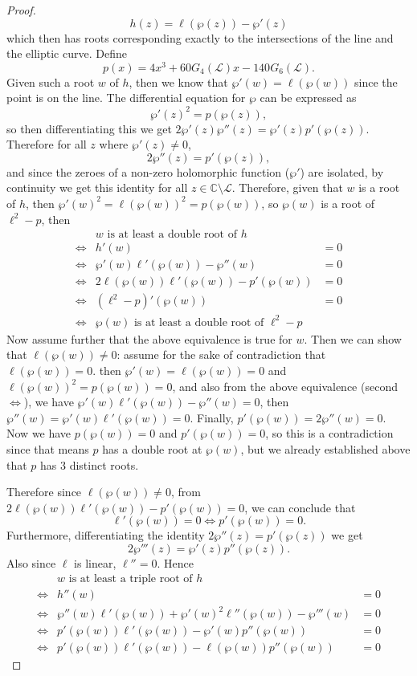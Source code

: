 \documentclass[10pt,a4paper]{amsart}
\begin{document}
\begin{proof}
$$h(z)=\ell(\wp(z))-\wp'(z)$$
which then has roots corresponding exactly to the intersections of the line and the elliptic curve. Define 
$$p(x)=4x^3+60G_4(\mathcal L)x-140G_6(\mathcal L).$$ Given such a root $w$ of $h$, then we know that $\wp'(w)=\ell(\wp(w))$ since the point is on the line. The differential equation for $\wp$ can be expressed as $$\wp'(z)^2=p(\wp(z)),$$
so then differentiating this we get $2\wp'(z)\wp''(z)=\wp'(z)p'(\wp(z))$. Therefore for all $z$ where $\wp'(z)\neq0$, 
$$2\wp''(z)=p'(\wp(z)),$$
and since the zeroes of a non-zero holomorphic function ($\wp'$) are isolated, by continuity we get this identity for all $z\in\mathbb C\setminus\mathcal L$. Therefore, given that $w$ is a root of $h$, then $\wp'(w)^2=\ell(\wp(w))^2=p(\wp(w))$, so $\wp(w)$ is a root of $\ell^2-p$, then
\begin{align*}
&\text{$w$ is at least a double root of $h$}\\
   \iff&h'(w)&=0\\ 
   \iff& \wp'(w)\ell'(\wp(w))-\wp''(w)&=0\\ 
   \iff&2\ell(\wp(w))\ell'(\wp(w))-p'(\wp(w))&=0\\
   \iff&(\ell^2-p)'(\wp(w))&=0\\
   \iff&\text{$\wp(w)$ is at least a double root of $\ell^2-p$}
\end{align*}
Now assume further that the above equivalence is true for $w$. Then we can show that $\ell(\wp(w))\neq0$: assume for the sake of contradiction that $\ell(\wp(w))=0$. then $\wp'(w)=\ell(\wp(w))=0$ and $\ell(\wp(w))^2=p(\wp(w))=0$, and also from the above equivalence (second $\iff$), we have $\wp'(w)\ell'(\wp(w))-\wp''(w)=0$, then $\wp''(w)=\wp'(w)\ell'(\wp(w))=0$. Finally, $p'(\wp(w))=2\wp''(w)=0$. Now we have $p(\wp(w))=0$ and $p'(\wp(w))=0$, so this is a contradiction since that means $p$ has a double root at $\wp(w)$, but we already established above that $p$ has $3$ distinct roots. 

Therefore since $\ell(\wp(w))\neq0$, from $2\ell(\wp(w))\ell'(\wp(w))-p'(\wp(w))=0$, we can conclude that 
$$\ell'(\wp(w))=0\iff p'(\wp(w))=0.$$
Furthermore, differentiating the identity $2\wp''(z)=p'(\wp(z))$ we get $$2\wp'''(z)=\wp'(z)p''(\wp(z)).$$
Also since $\ell$ is linear, $\ell''=0$. Hence
\begin{align*}
    &\text{$w$ is at least a triple root of $h$}\\
    \iff &h''(w)&=0\\
    \iff &\wp''(w)\ell'(\wp(w))+\wp'(w)^2\ell''(\wp(w))-\wp'''(w)&=0\\
    \iff &p'(\wp(w))\ell'(\wp(w))-\wp'(w)p''(\wp(w))&=0\\
    \iff &p'(\wp(w))\ell'(\wp(w))-\ell(\wp(w))p''(\wp(w))&=0
\end{align*}


\end{proof}
\end{document}
